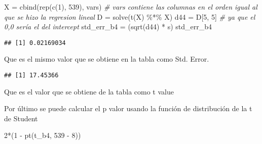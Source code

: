 \documentclass[
]{article}
\newenvironment{Shaded}{\begin{snugshade}}{\end{snugshade}}
\newcommand{\CommentTok}[1]{\textcolor[rgb]{0.56,0.35,0.01}{\textit{#1}}}
\newcommand{\DecValTok}[1]{\textcolor[rgb]{0.00,0.00,0.81}{#1}}
\newcommand{\FunctionTok}[1]{\textcolor[rgb]{0.00,0.00,0.00}{#1}}
\newcommand{\NormalTok}[1]{#1}
\newcommand{\OtherTok}[1]{\textcolor[rgb]{0.56,0.35,0.01}{#1}}
\newcommand{\SpecialCharTok}[1]{\textcolor[rgb]{0.00,0.00,0.00}{#1}}
\newcommand{\StringTok}[1]{\textcolor[rgb]{0.31,0.60,0.02}{#1}}
\begin{document}
\begin{Shaded}
\begin{Highlighting}[]
\NormalTok{X }\OtherTok{=} \FunctionTok{cbind}\NormalTok{(}\FunctionTok{rep}\NormalTok{(}\FunctionTok{c}\NormalTok{(}\DecValTok{1}\NormalTok{), }\DecValTok{539}\NormalTok{), vars) }\CommentTok{\# vars contiene las columnas en el orden igual al que se hizo la regresion lineal}
\NormalTok{D }\OtherTok{=} \FunctionTok{solve}\NormalTok{(}\FunctionTok{t}\NormalTok{(X) }\SpecialCharTok{\%*\%}\NormalTok{ X)}
\NormalTok{d44 }\OtherTok{=}\NormalTok{ D[}\DecValTok{5}\NormalTok{, }\DecValTok{5}\NormalTok{] }\CommentTok{\# ya que el 0,0 sería el del intercept}
\NormalTok{std\_err\_b4 }\OtherTok{=}\NormalTok{ (}\FunctionTok{sqrt}\NormalTok{(d44) }\SpecialCharTok{*}\NormalTok{ s)}
\NormalTok{std\_err\_b4}
\end{Highlighting}
\end{Shaded}

\begin{verbatim}
## [1] 0.02169034
\end{verbatim}

Que es el mismo valor que se obtiene en la tabla como Std. Error.

\begin{Shaded}
\end{Shaded}

\begin{verbatim}
## [1] 17.45366
\end{verbatim}

Que es el valor que se obtiene de la tabla como t value

Por último se puede calcular el p valor usando la función de
distribución de la t de Student

\begin{Shaded}
\begin{Highlighting}[]
\DecValTok{2}\SpecialCharTok{*}\NormalTok{(}\DecValTok{1} \SpecialCharTok{{-}} \FunctionTok{pt}\NormalTok{(t\_b4, }\DecValTok{539} \SpecialCharTok{{-}} \DecValTok{8}\NormalTok{))}
\end{Highlighting}
\end{Shaded}
\end{document}
